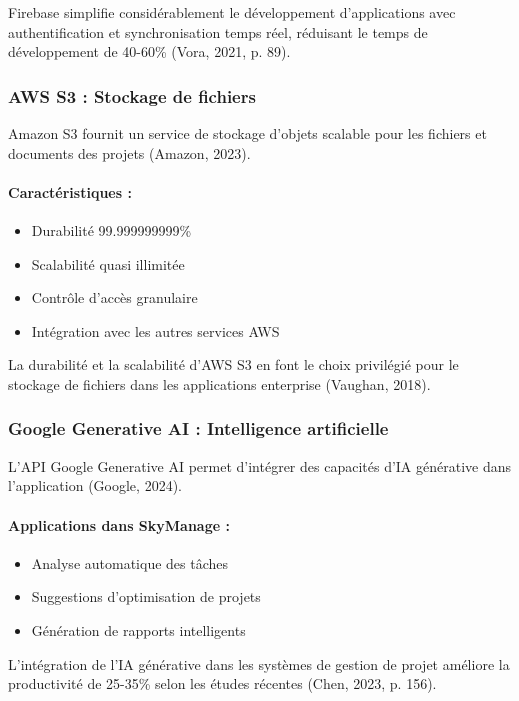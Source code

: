 Firebase simplifie considérablement le développement d'applications avec authentification et synchronisation temps réel, réduisant le temps de développement de 40-60\% (Vora, 2021, p. 89).

\subsubsection{AWS S3 : Stockage de fichiers}
Amazon S3 fournit un service de stockage d'objets scalable pour les fichiers et documents des projets (Amazon, 2023).

\paragraph{Caractéristiques :}
\begin{itemize}
    \item Durabilité 99.999999999\%
    \item Scalabilité quasi illimitée
    \item Contrôle d'accès granulaire
    \item Intégration avec les autres services AWS
\end{itemize}

La durabilité et la scalabilité d'AWS S3 en font le choix privilégié pour le stockage de fichiers dans les applications enterprise (Vaughan, 2018).

\subsubsection{Google Generative AI : Intelligence artificielle}
L'API Google Generative AI permet d'intégrer des capacités d'IA générative dans l'application (Google, 2024).

\paragraph{Applications dans SkyManage :}
\begin{itemize}
    \item Analyse automatique des tâches
    \item Suggestions d'optimisation de projets
    \item Génération de rapports intelligents
\end{itemize}

L'intégration de l'IA générative dans les systèmes de gestion de projet améliore la productivité de 25-35\% selon les études récentes (Chen, 2023, p. 156).

